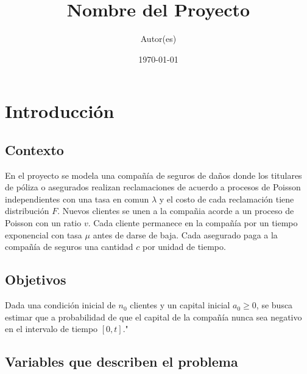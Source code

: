 \documentclass[12pt, a4paper]{article}
\title{Nombre del Proyecto}
\author{Autor(es)}
\date{\today}
\begin{document}
\maketitle

\section{Introducción} \label{S1}
\subsection*{Contexto}
En el proyecto se modela una compañía de seguros de daños donde los titulares de póliza o asegurados realizan reclamaciones
de acuerdo a procesos de Poisson independientes con una tasa en comun $\lambda$ y el costo de cada reclamación tiene distribución
$F$. Nuevos clientes se unen a la compañia acorde a un proceso de Poisson con un ratio $v$. Cada cliente permanece en la compañía
por un tiempo exponencial con tasa $\mu$ antes de darse de baja. Cada asegurado paga a la compañía de seguros una cantidad $c$ por 
unidad de tiempo. 

\subsection*{Objetivos}
Dada una condición inicial de $n_0$ clientes y un capital inicial $a_0 \geq 0$, se busca estimar que a probabilidad de que el 
capital de la compañía nunca sea negativo en el intervalo de tiempo $[0, t]$."

\subsection*{Variables que describen el problema}
\end{document}
